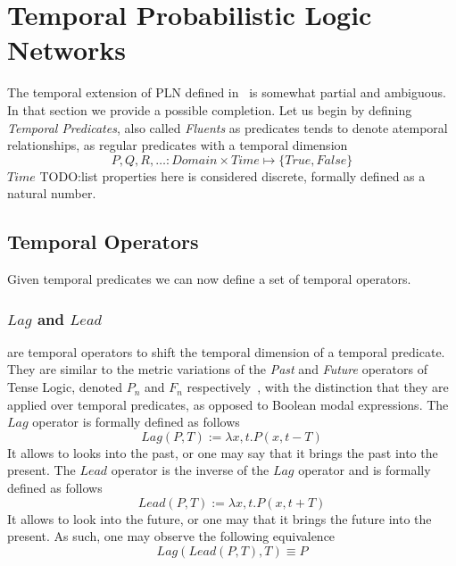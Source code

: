 \documentclass[runningheads]{llncs}
\newcommand{\TTrue}{\textit{True}}
\newcommand{\TFalse}{\textit{False}}
\newcommand{\TAtom}{\textit{Atom}}
\newcommand{\TTime}{\textit{Time}}
\newcommand{\TLamb}{\textit{Lambda}}
\newcommand{\TLag}{\textit{Lag}}
\newcommand{\TLead}{\textit{Lead}}
\begin{document}
\section{Temporal Probabilistic Logic Networks}
\label{sec:tpln}
The temporal extension of PLN defined in~\cite{TODO} is somewhat
partial and ambiguous.  In that section we provide a possible
completion.
Let us begin by defining \emph{Temporal Predicates}, also called
\emph{Fluents} as predicates tends to denote atemporal relationships,
as regular predicates with a temporal dimension
$$P, Q, R, \hdots: \textit{Domain} \times \TTime \mapsto \{\TTrue,
\TFalse\}$$
$\TTime$
TODO:list properties here is considered discrete, formally defined as
a natural number.

\subsection{Temporal Operators}
Given temporal predicates we can now define a set of temporal operators.

\subsubsection{$\TLag$ and $\TLead$} are temporal operators to shift
the temporal dimension of a temporal predicate.  They are similar to
the metric variations of the \emph{Past} and \emph{Future} operators
of Tense Logic, denoted $P_n$ and $F_n$ respectively~\cite{Prior1967},
with the distinction that they are applied over temporal predicates,
as opposed to Boolean modal expressions.  The $\TLag$ operator is
formally defined as follows
$$Lag(P, T) := \lambda x, t. P(x, t-T)$$
It allows to looks into the past, or one may say that it brings the
past into the present.
The $\TLead$ operator is the inverse of the $\TLag$ operator and is
formally defined as follows
$$Lead(P, T) := \lambda x, t. P(x, t+T)$$
It allows to look into the future, or one may that it brings the
future into the present.  As such, one may observe the following
equivalence
$$Lag(Lead(P, T), T) \equiv P$$
\end{document}
